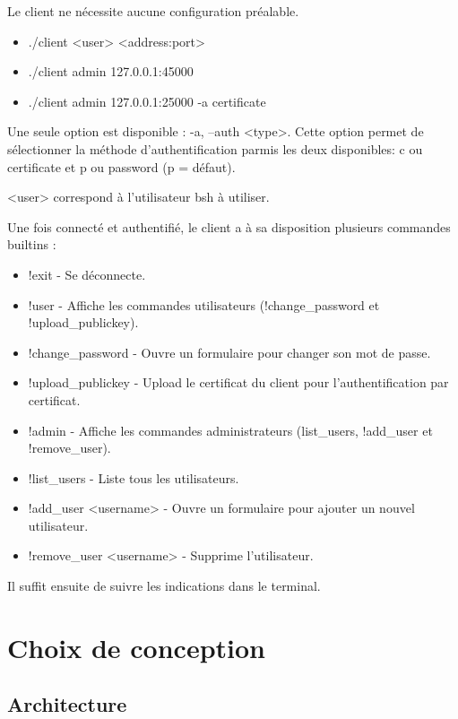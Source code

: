 \documentclass[french]{article}
\begin{document}
Le client ne nécessite aucune configuration préalable.

\begin{itemize}
	\item ./client <user> <address:port>
	\item ./client admin 127.0.0.1:45000
	\item ./client admin 127.0.0.1:25000 -a certificate
\end{itemize}

Une seule option est disponible : -a, --auth <type>. Cette option permet de sélectionner la méthode d'authentification parmis les deux disponibles: c ou certificate et p ou password (p = défaut).

\medspace

<user> correspond à l'utilisateur bsh à utiliser.

\medspace

Une fois connecté et authentifié, le client a à sa disposition plusieurs commandes builtins :

\begin{itemize}
	\item !exit - Se déconnecte.
	\item !user - Affiche les commandes utilisateurs (!change\_password et !upload\_publickey).
	\item !change\_password - Ouvre un formulaire pour changer son mot de passe.
	\item !upload\_publickey - Upload le certificat du client pour l'authentification par certificat.
	\item !admin - Affiche les commandes administrateurs (list\_users, !add\_user et !remove\_user).
	\item !list\_users - Liste tous les utilisateurs.
	\item !add\_user <username> - Ouvre un formulaire pour ajouter un nouvel utilisateur.
	\item !remove\_user <username> - Supprime l'utilisateur.
\end{itemize}

\medspace

Il suffit ensuite de suivre les indications dans le terminal.

\section{Choix de conception}

\subsection{Architecture}
\end{document}
